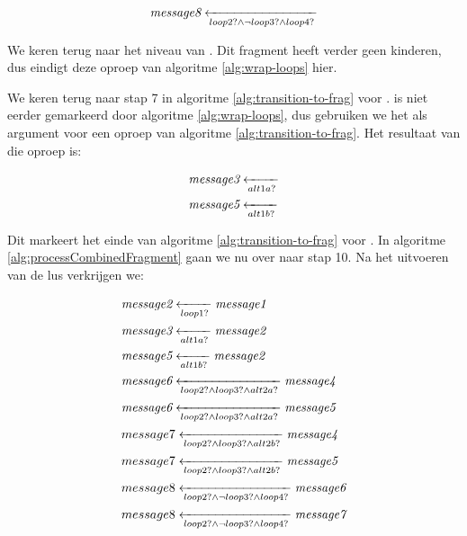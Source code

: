 \begin{align*}
	\transitionentry{\fragcond{loop2} \land \lnot \fragcond{loop3} \land \fragcond{loop4}}{\fragmessage{message8}}
\end{align*}

We keren terug naar het niveau van . Dit fragment heeft verder geen kinderen, dus eindigt deze oproep van algoritme \ref{alg:wrap-loops} hier.

We keren terug naar stap 7 in algoritme \ref{alg:transition-to-frag} voor .  is niet eerder gemarkeerd door algoritme \ref{alg:wrap-loops}, dus gebruiken we het als argument voor een oproep van algoritme \ref{alg:transition-to-frag}. Het resultaat van die oproep is:

\begin{align*}
	&\transitionentry{\fragcond{alt1a}}{\fragmessage{message3}} \\
	&\transitionentry{\fragcond{alt1b}}{\fragmessage{message5}}
\end{align*}

Dit markeert het einde van algoritme \ref{alg:transition-to-frag} voor . In algoritme \ref{alg:processCombinedFragment} gaan we nu over naar stap 10. Na het uitvoeren van de lus verkrijgen we:

\begin{align*}
	&\transitionentry[\fragmessage{message1}]{\fragcond{loop1}}{\fragmessage{message2}} \\
	&\transitionentry[\fragmessage{message2}]{\fragcond{alt1a}}{\fragmessage{message3}} \\
	&\transitionentry[\fragmessage{message2}]{\fragcond{alt1b}}{\fragmessage{message5}} \\
	&\transitionentry[\fragmessage{message4}]{\fragcond{loop2} \land \fragcond{loop3} \land \fragcond{alt2a}}{\fragmessage{message6}} \\
	&\transitionentry[\fragmessage{message5}]{\fragcond{loop2} \land \fragcond{loop3} \land \fragcond{alt2a}}{\fragmessage{message6}} \\
	&\transitionentry[\fragmessage{message4}]{\fragcond{loop2} \land \fragcond{loop3} \land \fragcond{alt2b}}{message7} \\
	&\transitionentry[\fragmessage{message5}]{\fragcond{loop2} \land \fragcond{loop3} \land \fragcond{alt2b}}{message7} \\
	&\transitionentry[\fragmessage{message6}]{\fragcond{loop2} \land \lnot \fragcond{loop3} \land \fragcond{loop4}}{message8} \\
	&\transitionentry[\fragmessage{message7}]{\fragcond{loop2} \land \lnot \fragcond{loop3} \land \fragcond{loop4}}{message8}
\end{align*}

